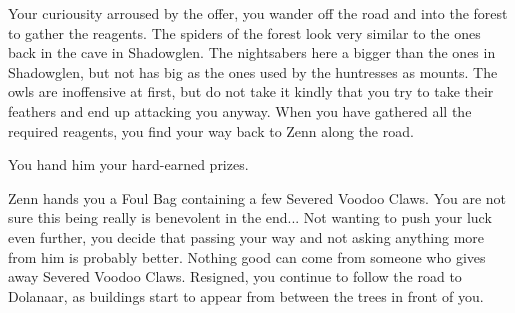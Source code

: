 
Your curiousity arroused by the offer, you wander off the road and into the forest to gather the reagents. The spiders of the forest look very similar to the ones back in the cave in Shadowglen. The nightsabers here a bigger than the ones in Shadowglen, but not has big as the ones used by the huntresses as mounts. The owls are inoffensive at first, but do not take it kindly that you try to take their feathers and end up attacking you anyway. When you have gathered all the required reagents, you find your way back to Zenn along the road. %


You hand him your hard-earned prizes.


Zenn hands you a Foul Bag containing a few Severed Voodoo Claws. You are not sure this being really is benevolent in the end... Not wanting to push your luck even further, you decide that passing your way and not asking anything more from him is probably better. Nothing good can come from someone who gives away Severed Voodoo Claws. Resigned, you continue to follow the road to Dolanaar, as buildings start to appear from between the trees in front of you.
